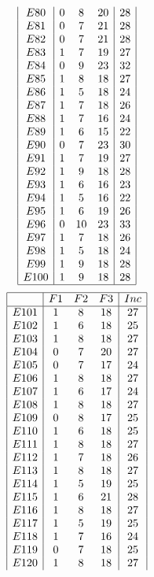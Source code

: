 \documentclass[12pt]{article}
\begin{document}
\begin{multicols}{3}
\begin{equation*}
\begin{array}{|c|ccc|c|}
E80&0&8&20&28\\
E81&0&7&21&28\\
E82&0&7&21&28\\
E83&1&7&19&27\\
E84&0&9&23&32\\
E85&1&8&18&27\\
E86&1&5&18&24\\
E87&1&7&18&26\\
E88&1&7&16&24\\
E89&1&6&15&22\\
E90&0&7&23&30\\
E91&1&7&19&27\\
E92&1&9&18&28\\
E93&1&6&16&23\\
E94&1&5&16&22\\
E95&1&6&19&26\\
E96&0&10&23&33\\
E97&1&7&18&26\\
E98&1&5&18&24\\
E99&1&9&18&28\\
E100&1&9&18&28\\
\hline
\end{array}
\end{equation*}
\begin{equation*}
\begin{array}{|c|ccc|c|}
\hline
&F1&F2&F3&Inc\\
\hline
E101&1&8&18&27\\
E102&1&6&18&25\\
E103&1&8&18&27\\
E104&0&7&20&27\\
E105&0&7&17&24\\
E106&1&8&18&27\\
E107&1&6&17&24\\
E108&1&8&18&27\\
E109&0&8&17&25\\
E110&1&6&18&25\\
E111&1&8&18&27\\
E112&1&7&18&26\\
E113&1&8&18&27\\
E114&1&5&19&25\\
E115&1&6&21&28\\
E116&1&8&18&27\\
E117&1&5&19&25\\
E118&1&7&16&24\\
E119&0&7&18&25\\
E120&1&8&18&27\\

\end{array}
\end{equation*}
\end{multicols}
\end{document}
